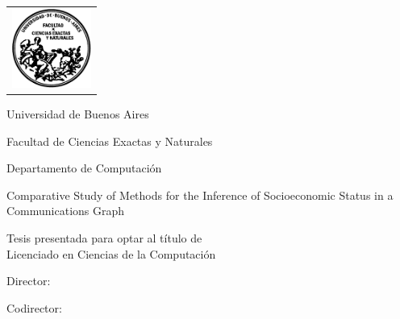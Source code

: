 
\makeatletter

\newcommand{\HRule}{\rule{\linewidth}{0.2mm}}
%
\thispagestyle{empty}

\begin{center}\leavevmode

\vspace{-2cm}

\begin{tabular}{l}
\includegraphics[width=2.6cm]{template_tesis/logofcen.pdf}
\end{tabular}

{\large \sc Universidad de Buenos Aires}

{\large \sc Facultad de Ciencias Exactas y Naturales}

{\large \sc Departamento de Computaci\'on}

\vspace{4.0cm}

\begin{mdseries}

{\Large Comparative Study of Methods for the
Inference of Socioeconomic Status
in a Communications Graph}

\end{mdseries}

\vspace{2cm}

{\large Tesis presentada para optar al título de \\ Licenciado en Ciencias de la Computación}

\vspace{2cm}

{\Large \@author}

\end{center}

\vfill

{\large {Director: \director}}

\vspace{.2cm}

{\large {Codirector: \codirector}}

\vspace{.2cm}

{\large {\@date}}

\makeatother
